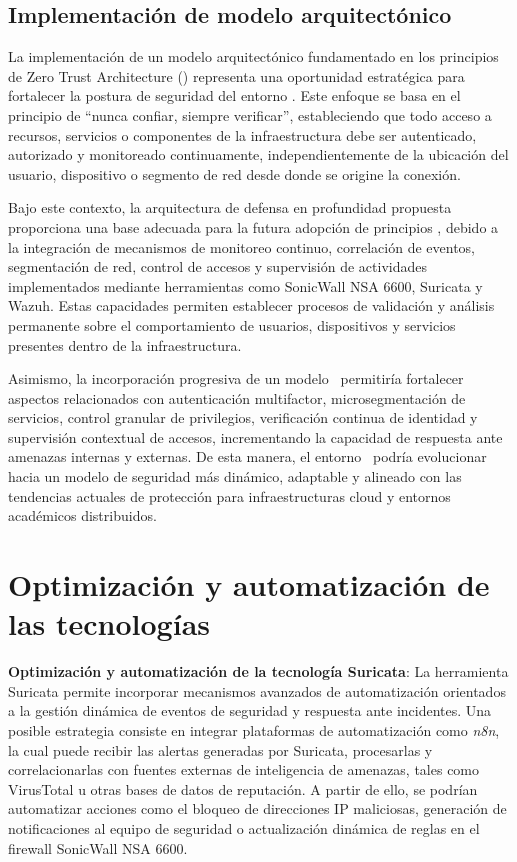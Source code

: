 \subsection{Implementación de modelo arquitectónico \ZTA}
\noindent

La implementación de un modelo arquitectónico fundamentado en los principios de Zero Trust Architecture (\ZTA) representa una oportunidad 
estratégica para fortalecer la postura de seguridad del entorno \GRID. Este enfoque se basa en el principio de ``nunca confiar, siempre 
verificar'', estableciendo que todo acceso a recursos, servicios o componentes de la infraestructura debe ser autenticado, autorizado y 
monitoreado continuamente, independientemente de la ubicación del usuario, dispositivo o segmento de red desde donde se origine la conexión.

Bajo este contexto, la arquitectura de defensa en profundidad propuesta proporciona una base adecuada para la futura adopción de principios 
\ZTA, debido a la integración de mecanismos de monitoreo continuo, correlación de eventos, segmentación de red, control de accesos y 
supervisión de actividades implementados mediante herramientas como SonicWall NSA 6600, Suricata y Wazuh. Estas capacidades permiten 
establecer procesos de validación y análisis permanente sobre el comportamiento de usuarios, dispositivos y servicios presentes dentro de 
la infraestructura.

Asimismo, la incorporación progresiva de un modelo \ZTA\ permitiría fortalecer aspectos relacionados con autenticación multifactor, 
microsegmentación de servicios, control granular de privilegios, verificación continua de identidad y supervisión contextual de accesos, 
incrementando la capacidad de respuesta ante amenazas internas y externas. De esta manera, el entorno \GRID\ podría evolucionar hacia un 
modelo de seguridad más dinámico, adaptable y alineado con las tendencias actuales de protección para infraestructuras cloud y entornos 
académicos distribuidos.

\section{Optimización y automatización de las tecnologías}
\noindent

\textbf{Optimización y automatización de la tecnología Suricata}:  
La herramienta Suricata permite incorporar mecanismos avanzados de automatización orientados a la gestión dinámica de eventos de seguridad 
y respuesta ante incidentes. Una posible estrategia consiste en integrar plataformas de automatización como \textit{n8n}, la cual puede 
recibir las alertas generadas por Suricata, procesarlas y correlacionarlas con fuentes externas de inteligencia de amenazas, tales como 
VirusTotal u otras bases de datos de reputación. A partir de ello, se podrían automatizar acciones como el bloqueo de direcciones IP 
maliciosas, generación de notificaciones al equipo de seguridad o actualización dinámica de reglas en el firewall SonicWall NSA 6600.

